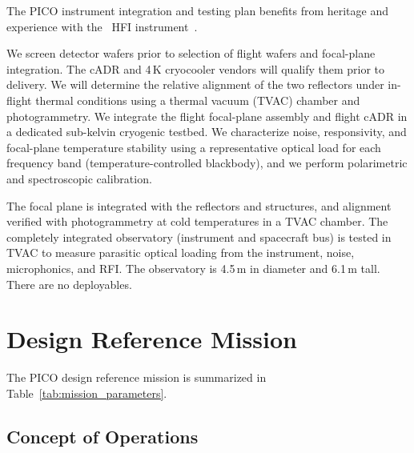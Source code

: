 The PICO instrument integration and testing plan benefits from heritage and experience with the \planck\ HFI instrument~\citep{Pajot2010}.

We screen detector wafers prior to selection of flight wafers and focal-plane integration. The cADR and 4\,K cryocooler vendors will qualify them prior to delivery. We will determine the relative alignment of the two reflectors under in-flight thermal conditions using a thermal vacuum (TVAC) chamber and photogrammetry. We integrate the flight focal-plane assembly and flight cADR in a dedicated sub-kelvin cryogenic testbed. We characterize noise, responsivity, and focal-plane temperature stability using a representative optical load for each frequency band (temperature-controlled blackbody), and we perform polarimetric and spectroscopic calibration.



The focal plane is integrated with the reflectors and structures, and alignment verified with photogrammetry at cold temperatures in a TVAC chamber.  The completely integrated observatory (instrument and spacecraft bus) is tested in TVAC to measure parasitic optical loading from the instrument, noise, microphonics, and RFI. The observatory is 4.5\,m in diameter and 6.1\,m tall. There are no deployables.

\section{Design Reference Mission}
\label{sec:design_reference} %
%

%
The PICO design reference mission is summarized in Table~\ref{tab:mission_parameters}.

\subsection{Concept of Operations}
\label{sec:operations} %

